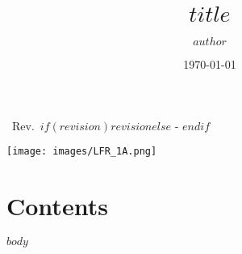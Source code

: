 \documentclass[11pt]{report}
\author{$author$}
\title{$title$}
\date{\today}
\makeatletter
\let\Oldsection\section
\renewcommand{\section}{\FloatBarrier\Oldsection}
\let\thetitle\@title
\def \currentrevision{$if(revision)$$revision$$else$ - $endif$}
\makeatother
\begin{document}
\pagestyle{TitlePages}

\begin{center}
    {\LARGE \thetitle}

    \vspace{0.3cm}

    {\Large ~Rev.~\currentrevision}

    \vspace{1cm}
\end{center}

\vspace{6cm}

\texttt{[image: images/LFR\_1A.png]}

\newpage

\pagestyle{General}

\section{Contents}

\doublespacing
\tableofcontents
\singlespacing

\newpage


$body$


\end{document}
